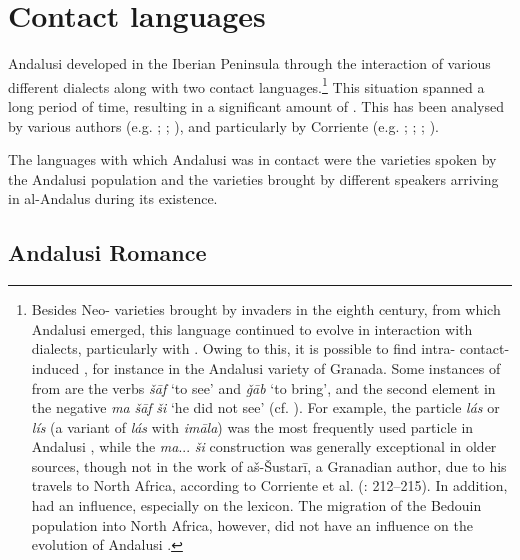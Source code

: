 \documentclass[output=paper,modfonts,nonflat]{langsci/langscibook}
\begin{document}
\section{Contact languages}
Andalusi  developed in the Iberian Peninsula through the interaction of various different  dialects along with two contact languages.\footnote{Besides  Neo- varieties brought by invaders in the eighth century, from which Andalusi  emerged, this language continued to evolve in interaction with  dialects, particularly with  . Owing to this, it is possible to find intra- contact-induced , for instance in the Andalusi variety of Granada. Some instances of  from  are the verbs \textit{šāf} ‘to see’ and \textit{ǧāb} ‘to bring’, and the second element in the negative \textit{ma} \textit{šāf} \textit{ši} ‘he did not see’ (cf. \citealt[57]{Corriente1998stress}). For example, the particle \textit{lás} or \textit{lís} (a variant of \textit{lás} with \textit{imāla})  was the most frequently used  particle in Andalusi , while the \textit{ma}... \textit{ši} construction was generally exceptional in older sources, though not in the work of aš-Šustarī, a Granadian author, due to his travels to North Africa, according to Corriente et al. (\citeyear{CorrientePereiraVicente2015}: 212--215). In addition,   had an influence, especially on the lexicon. The migration of the Bedouin population into North Africa, however, did not have an influence on the evolution of Andalusi .} This situation spanned a long period of time, resulting in a significant amount of . This has been analysed by various authors (e.g. \citealt{Ferrando1995}; \citeyear{Ferrando1997}; \citealt{Vicente2006}), and particularly by Corriente (e.g. \citealt{Corriente1981}; \citeyear{Corriente1992book}; \citeyear{Corriente2000}; \citeyear{Corriente2002}). 

The languages with which Andalusi  was in contact were the  varieties spoken by the Andalusi population and the  varieties brought by different  speakers arriving in al-Andalus during its existence. 

\subsection{Andalusi Romance}\label{AR}
\end{document}
